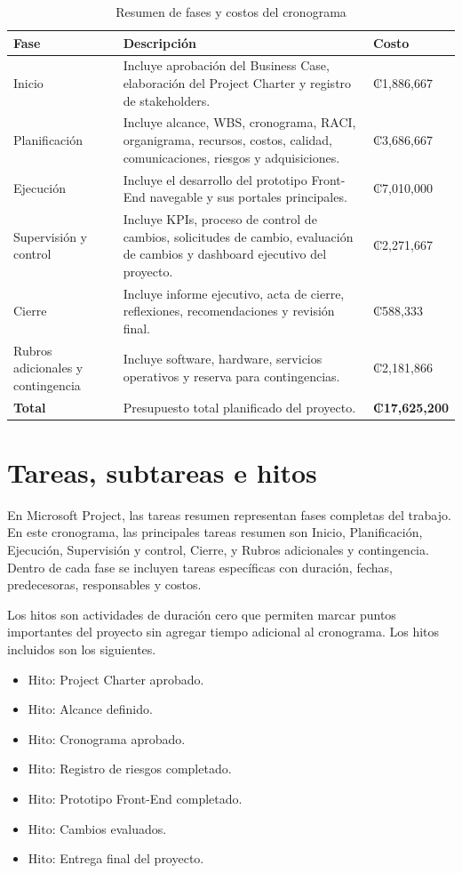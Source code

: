 \documentclass[11pt,spanish]{article}
\begin{document}
\begin{table}[H]
\centering
\caption{Resumen de fases y costos del cronograma}
\begin{tabularx}{\textwidth}{p{3.8cm} Y p{3cm}}
\toprule
\textbf{Fase} & \textbf{Descripción} & \textbf{Costo} \\
\midrule
Inicio & Incluye aprobación del Business Case, elaboración del Project Charter y registro de stakeholders. & ₡1,886,667 \\
Planificación & Incluye alcance, WBS, cronograma, RACI, organigrama, recursos, costos, calidad, comunicaciones, riesgos y adquisiciones. & ₡3,686,667 \\
Ejecución & Incluye el desarrollo del prototipo Front-End navegable y sus portales principales. & ₡7,010,000 \\
Supervisión y control & Incluye KPIs, proceso de control de cambios, solicitudes de cambio, evaluación de cambios y dashboard ejecutivo del proyecto. & ₡2,271,667 \\
Cierre & Incluye informe ejecutivo, acta de cierre, reflexiones, recomendaciones y revisión final. & ₡588,333 \\
Rubros adicionales y contingencia & Incluye software, hardware, servicios operativos y reserva para contingencias. & ₡2,181,866 \\
\midrule
\textbf{Total} & Presupuesto total planificado del proyecto. & \textbf{₡17,625,200} \\
\bottomrule
\end{tabularx}
\end{table}

\section{Tareas, subtareas e hitos}

En Microsoft Project, las tareas resumen representan fases completas del trabajo. En este cronograma, las principales tareas resumen son Inicio, Planificación, Ejecución, Supervisión y control, Cierre, y Rubros adicionales y contingencia. Dentro de cada fase se incluyen tareas específicas con duración, fechas, predecesoras, responsables y costos.

Los hitos son actividades de duración cero que permiten marcar puntos importantes del proyecto sin agregar tiempo adicional al cronograma. Los hitos incluidos son los siguientes.

\begin{itemize}[leftmargin=*, label={\textbullet}]
    \item Hito: Project Charter aprobado.
    \item Hito: Alcance definido.
    \item Hito: Cronograma aprobado.
    \item Hito: Registro de riesgos completado.
    \item Hito: Prototipo Front-End completado.
    \item Hito: Cambios evaluados.
    \item Hito: Entrega final del proyecto.
\end{itemize}
\end{document}
